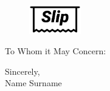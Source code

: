 \documentclass{letter}
\date{}
\begin{document}
\begin{letter}
    \centering

    \hfill
    \begin{figure}%
        \vspace{4em}
        \includegraphics[width=0.2\textwidth]{../slipLogoDark.png}
    \end{figure}

    \opening{To Whom it May Concern:} %
    \medskip

    \lipsum[1-5]

    \medskip
    Sincerely, \\
    Name Surname \\

\end{letter}
\end{document}
